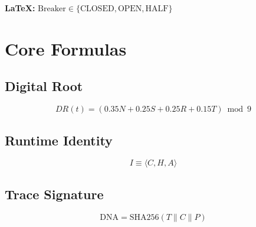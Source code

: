 \documentclass[11pt]{article}
\begin{document}
\textbf{LaTeX:} $\text{Breaker} \in \{\text{CLOSED}, \text{OPEN}, \text{HALF}\}$

\section{Core Formulas}

\subsection{Digital Root}
\[
DR(t) = (0.35N + 0.25S + 0.25R + 0.15T) \bmod 9
\]

\subsection{Runtime Identity}
\[
I \equiv \langle C, H, A \rangle
\]

\subsection{Trace Signature}
\[
\text{DNA} = \text{SHA256}(T \| C \| P)
\]
\end{document}

